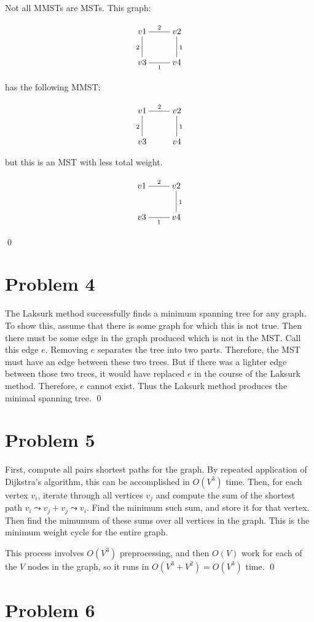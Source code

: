\documentclass[twoside]{amsart}
\begin{document}
Not all MMSTs are MSTs.  This graph:

\[\xymatrix{
  v1 \ar@{-}[r]^2 \ar@{-}[d]_2 & v2 \\
  v3 \ar@{-}[r]_1 & v4 \ar@{-}[u]_1
}\]

has the following MMST:

\[\xymatrix{
  v1 \ar@{-}[r]^2 \ar@{-}[d]_2 & v2 \\
  v3  & v4 \ar@{-}[u]_1
}\]

but this is an MST with less total weight.

\[\xymatrix{
  v1 \ar@{-}[r]^2  & v2 \\
  v3 \ar@{-}[r]_1 & v4 \ar@{-}[u]_1
}\]

\qed


\section*{Problem 4}

The Laksurk method successfully finds a minimum spanning tree for any
graph.  To show this, assume that there is some graph for which this
is not true.  Then there must be some edge in the graph produced which
is not in the MST.  Call this edge $e$.  Removing $e$ separates the
tree into two parts.  Therefore, the MST must have an edge between
these two trees.  But if there was a lighter edge between those two
trees, it would have replaced $e$ in the course of the Laksurk
method.  Therefore, $e$ cannot exist.  Thus the Laksurk method
produces the minimal spanning tree. \qed

\section*{Problem 5}

First, compute all pairs shortest paths for the graph.  By repeated
application of Dijkstra's algorithm, this can be accomplished in
$O(V^3)$ time.  Then, for each vertex $v_i$, iterate through all
vertices $v_j$ and compute the sum of the shortest path $v_i \leadsto v_j +
v_j \leadsto v_i$.  Find the minimum such sum, and store it for that
vertex.  Then find the mimumum of these sums over all vertices in the
graph.  This is the minimum weight cycle for the entire graph.

This process involves $O(V^3)$ preprocessing, and then $O(V)$ work for
each of the $V$ nodes in the graph, so it runs in $O(V^3 + V^2) =
O(V^3)$ time.  \qed


\section*{Problem 6}
\end{document}
